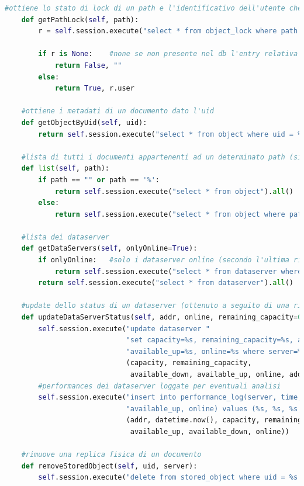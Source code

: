 \documentclass[11pt,a4paper,english]{article}
\begin{document}
\begin{lstlisting}[language=Python, title=Codice]
	#ottiene lo stato di lock di un path e l'identificativo dell'utente che detiene il lock (se bloccato, altrimenti "")
    def getPathLock(self, path):
        r = self.session.execute("select * from object_lock where path = %s", (path, )).one()
        
        if r is None:    #none se non presente nel db l'entry relativa al path specificato (quindi e' sbloccato)
            return False, ""
        else:
            return True, r.user

	#ottiene i metadati di un documento dato l'uid
    def getObjectByUid(self, uid):
        return self.session.execute("select * from object where uid = %s", (uid, )).one()

	#lista di tutti i documenti appartenenti ad un determinato path (singolo o repository)
    def list(self, path):
        if path == "" or path == '%':
            return self.session.execute("select * from object").all()
        else:
            return self.session.execute("select * from object where path like %s", (path, )).all()

	#lista dei dataserver
    def getDataServers(self, onlyOnline=True):
        if onlyOnline:   #solo i dataserver online (secondo l'ultima rilevazione)
            return self.session.execute("select * from dataserver where online=true allow filtering").all()
        return self.session.execute("select * from dataserver").all()

    #update dello status di un dataserver (ottenuto a seguito di una rilevazione)
    def updateDataServerStatus(self, addr, online, remaining_capacity=0, capacity=0, available_down=.0, available_up=.0):
        self.session.execute("update dataserver "
                             "set capacity=%s, remaining_capacity=%s, available_down=%s, "
                             "available_up=%s, online=%s where server=%s",
                             (capacity, remaining_capacity,
                              available_down, available_up, online, addr))
        #performances dei dataserver loggate per eventuali analisi
        self.session.execute("insert into performance_log(server, time, capacity, remaining_capacity, available_down,"
                             "available_up, online) values (%s, %s, %s, %s, %s, %s, %s)",
                             (addr, datetime.now(), capacity, remaining_capacity,
                              available_up, available_down, online))

    #rimuove una replica fisica di un documento
    def removeStoredObject(self, uid, server):
        self.session.execute("delete from stored_object where uid = %s and server = %s", (uid, server))


\end{lstlisting}
\end{document}
